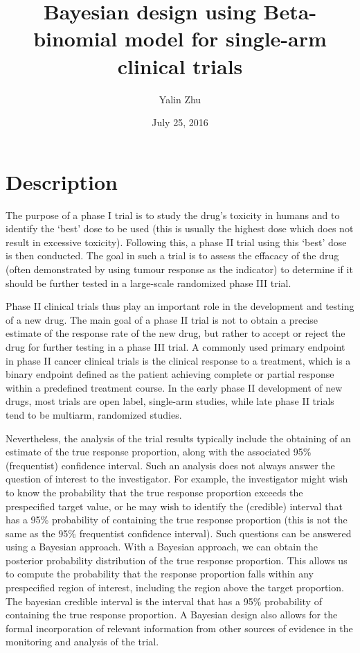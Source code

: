 \documentclass[]{article}
\title{Bayesian design using Beta-binomial model for single-arm clinical trials}
\author{Yalin Zhu}
\date{July 25, 2016}
\begin{document}
\maketitle

\section{Description}\label{description}

The purpose of a phase I trial is to study the drug's toxicity in humans
and to identify the `best' dose to be used (this is usually the highest
dose which does not result in excessive toxicity). Following this, a
phase II trial using this `best' dose is then conducted. The goal in
such a trial is to assess the effacacy of the drug (often demonstrated
by using tumour response as the indicator) to determine if it should be
further tested in a large-scale randomized phase III trial.

Phase II clinical trials thus play an important role in the development
and testing of a new drug. The main goal of a phase II trial is not to
obtain a precise estimate of the response rate of the new drug, but
rather to accept or reject the drug for further testing in a phase III
trial. A commonly used primary endpoint in phase II cancer clinical
trials is the clinical response to a treatment, which is a binary
endpoint defined as the patient achieving complete or partial response
within a predefined treatment course. In the early phase II development
of new drugs, most trials are open label, single-arm studies, while late
phase II trials tend to be multiarm, randomized studies.

Nevertheless, the analysis of the trial results typically include the
obtaining of an estimate of the true response proportion, along with the
associated 95\% (frequentist) confidence interval. Such an analysis does
not always answer the question of interest to the investigator. For
example, the investigator might wish to know the probability that the
true response proportion exceeds the prespecified target value, or he
may wish to identify the (credible) interval that has a 95\% probability
of containing the true response proportion (this is not the same as the
95\% frequentist confidence interval). Such questions can be answered
using a Bayesian approach. With a Bayesian approach, we can obtain the
posterior probability distribution of the true response proportion. This
allows us to compute the probability that the response proportion falls
within any prespecified region of interest, including the region above
the target proportion. The bayesian credible interval is the interval
that has a 95\% probability of containing the true response proportion.
A Bayesian design also allows for the formal incorporation of relevant
information from other sources of evidence in the monitoring and
analysis of the trial.
\end{document}
